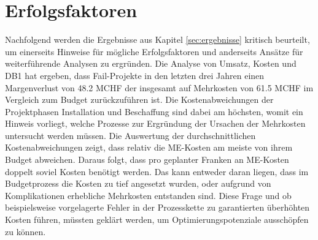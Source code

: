 \section{Erfolgsfaktoren}\label{sec:diskerf}
Nachfolgend werden die Ergebnisse aus Kapitel \ref{sec:ergebnisse} kritisch beurteilt, um einerseits Hinweise für mögliche Erfolgsfaktoren und anderseits Ansätze für weiterführende Analysen zu ergründen.
\newline\newline
Die Analyse von Umsatz, Kosten und DB1 hat ergeben, dass Fail-Projekte in den letzten drei Jahren einen Margenverlust von 48.2 MCHF der insgesamt auf Mehrkosten von 61.5 MCHF im Vergleich zum Budget zurückzuführen ist. Die Kostenabweichungen der Projektphasen Installation und Beschaffung sind dabei am höchsten, womit ein Hinweis vorliegt, welche Prozesse zur Ergründung der Ursachen der Mehrkosten untersucht werden müssen. Die Auswertung der durchschnittlichen Kostenabweichungen zeigt, dass relativ die ME-Kosten am meiste von ihrem Budget abweichen. Daraus folgt, dass pro geplanter Franken an ME-Kosten doppelt soviel Kosten benötigt werden. Das kann entweder daran liegen, dass im Budgetprozess die Kosten zu tief angesetzt wurden, oder aufgrund von Komplikationen erhebliche Mehrkosten entstanden sind. Diese Frage und ob beispielsweise vorgelagerte Fehler in der Prozesskette zu garantierten überhöhten Kosten führen, müssten geklärt werden, um Optimierungspotenziale ausschöpfen zu können.
